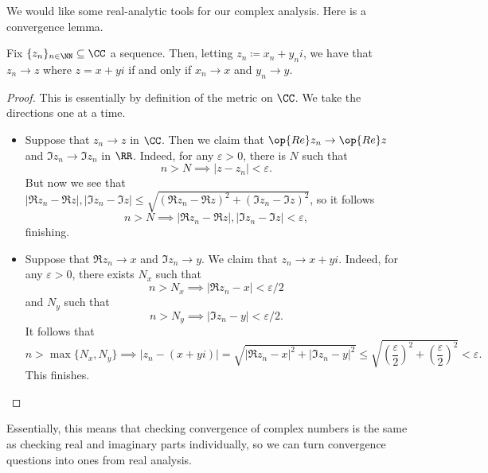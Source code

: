 \documentclass[../notes.tex]{subfiles}
\begin{document}
We would like some real-analytic tools for our complex analysis. Here is a convergence lemma.
\begin{lemma} \label{lem:reducetor}
	Fix $\{z_n\}_{n\in\NN}\subseteq\CC$ a sequence. Then, letting $z_n\coloneqq x_n+y_ni$, we have that $z_n\to z$ where $z=x+yi$ if and only if $x_n\to x$ and $y_n\to y$.
\end{lemma}
\begin{proof}
	This is essentially by definition of the metric on $\CC$. We take the directions one at a time.
	\begin{itemize}
		\item Suppose that $z_n\to z$ in $\CC$. Then we claim that $\op{Re}z_n\to\op{Re}z$ and $\Im z_n\to\Im z_n$ in $\RR$. Indeed, for any $\varepsilon>0$, there is $N$ such that
		\[n>N\implies|z-z_n|<\varepsilon.\]
		But now we see that $|\Re z_n-\Re z|,|\Im z_n-\Im z|\le\sqrt{(\Re z_n-\Re z)^2+(\Im z_n-\Im z)^2}$, so it follows
		\[n>N\implies|\Re z_n-\Re z|,|\Im z_n-\Im z|<\varepsilon,\]
		finishing.
		\item Suppose that $\Re z_n\to x$ and $\Im z_n\to y$. We claim that $z_n\to x+yi$. Indeed, for any $\varepsilon>0$, there exists $N_x$ such that
		\[n>N_x\implies|\Re z_n-x|<\varepsilon/2\]
		and $N_y$ such that
		\[n>N_y\implies|\Im z_n-y|<\varepsilon/2.\]
		It follows that
		\[n>\max\{N_x,N_y\}\implies|z_n-(x+yi)|=\sqrt{|\Re z_n-x|^2+|\Im z_n-y|^2}\le\sqrt{\left(\frac\varepsilon2\right)^2+\left(\frac\varepsilon2\right)^2}<\varepsilon.\]
		This finishes.
		\qedhere
	\end{itemize}
\end{proof}
Essentially, this means that checking convergence of complex numbers is the same as checking real and imaginary parts individually, so we can turn convergence questions into ones from real analysis.
\end{document}

